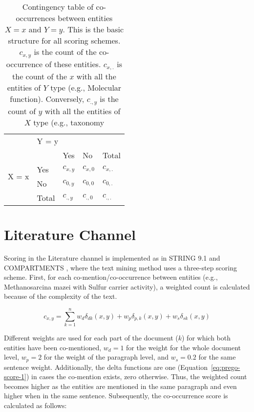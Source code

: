 \begin{table}[ht]
   \centering
   \begin{tabular}{c|llll}
    & \multicolumn{4}{l}{Y = y} \\ \cline{2-5} 
   \multirow{4}{*}{X = x} &  & Yes & No & Total \\ \cline{3-5} 
    & \multicolumn{1}{l|}{Yes} & $c_{x,y}$ & $c_{x,0}$ & $c_{x,.}$ \\
    & \multicolumn{1}{l|}{No} & $c_{0,y}$ & $c_{0,0}$ & $c_{0,.}$ \\
    & \multicolumn{1}{l|}{Total} & $c_{.,y}$ & $c_{.,0}$ & $c_{.,.}$
   \end{tabular}
   \caption[PREGO contingency table between two terms]{Contingency table of co-occurrences between entities $X = x$ and $Y = y$. 
   This is the basic structure for all scoring schemes. $c_{x,y}$ is the count of the co-occurrence of these entities. $c_{x,.}$ is the count of the $x$ with all the entities of $Y$ type (e.g., Molecular function). Conversely, $c_{.,y}$ is the count of $y$ with all the entities of $X$ type (e.g., taxonomy}
   \label{table:pregoA1}
\end{table}


\section*{Literature Channel}

Scoring in the Literature channel is implemented as in STRING 9.1 \parencite{franceschini2012string} and COMPARTMENTS \parencite{binder2014compartments}, where the text mining method uses a three-step scoring scheme. 
First, for each co-mention/co-occurrence between entities (e.g., Methanosarcina mazei with Sulfur carrier activity), a weighted count is calculated because of the complexity of the text.  


\begin{equation}
   c_{x,y} = \sum_{k=1}^{n}{w_d \delta_{dk}(x,y) +w_p \delta_{p,k}(x,y) + w_s \delta_{sk}(x,y)}
   \label{eq:prego-score-1}
\end{equation}



Different weights are used for each part of the document ($k$) for which both entities have been co-mentioned, $w_d = 1$ for the weight for the whole document level, $w_p = 2$ for the weight of the paragraph level, and $w_s = 0.2$ for the same sentence weight. 
Additionally, the delta functions are one (Equation~\ref{eq:prego-score-1}) in cases the co-mention exists, zero otherwise. Thus, the weighted count becomes higher as the entities are mentioned in the same paragraph and even higher when in the same sentence.
Subsequently, the co-occurrence score is calculated as follows:

